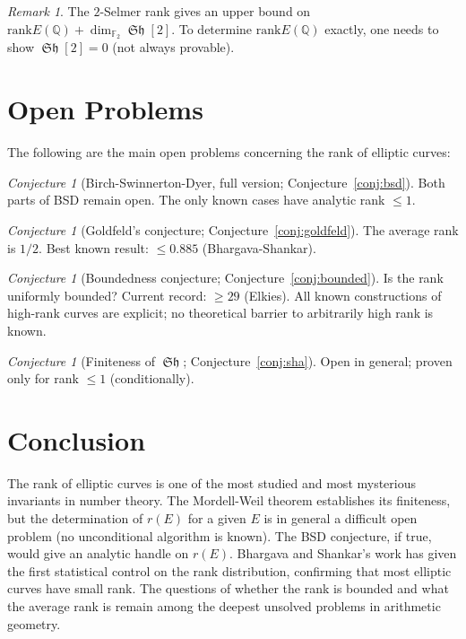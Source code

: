 \documentclass[12pt,a4paper]{amsart}
\theoremstyle{definition}
\theoremstyle{remark}
\newtheorem{remark}[theorem]{Remark}
\newtheorem{conjecture}[theorem]{Conjecture}
\newcommand{\Q}{\mathbb{Q}}
\newcommand{\F}{\mathbb{F}}
\DeclareMathOperator{\Sha}{\mathfrak{Sh}}
\newcommand{\rank}{\mathrm{rank}}
\begin{document}
\begin{remark}
  The $2$-Selmer rank gives an upper bound on $\rank E(\Q) + \dim_{\F_2} \Sha[2]$.
  To determine $\rank E(\Q)$ exactly, one needs to show $\Sha[2] = 0$ (not always provable).
\end{remark}

\section{Open Problems}\label{sec:openproblems}

The following are the main open problems concerning the rank of elliptic curves:

\begin{conjecture}[Birch-Swinnerton-Dyer, full version; Conjecture~\ref{conj:bsd}]
  Both parts of BSD remain open.
  The only known cases have analytic rank $\leq 1$.
\end{conjecture}

\begin{conjecture}[Goldfeld's conjecture; Conjecture~\ref{conj:goldfeld}]
  The average rank is $1/2$.
  Best known result: $\leq 0.885$ (Bhargava-Shankar).
\end{conjecture}

\begin{conjecture}[Boundedness conjecture; Conjecture~\ref{conj:bounded}]
  Is the rank uniformly bounded?
  Current record: $\geq 29$ (Elkies).
  All known constructions of high-rank curves are explicit; no theoretical barrier
  to arbitrarily high rank is known.
\end{conjecture}

\begin{conjecture}[Finiteness of $\Sha$; Conjecture~\ref{conj:sha}]
  Open in general; proven only for rank $\leq 1$ (conditionally).
\end{conjecture}

\section{Conclusion}\label{sec:conclusion}

The rank of elliptic curves is one of the most studied and most mysterious invariants
in number theory. The Mordell-Weil theorem establishes its finiteness, but the
determination of $r(E)$ for a given $E$ is in general a difficult open problem (no
unconditional algorithm is known). The BSD conjecture, if true, would give an
analytic handle on $r(E)$. Bhargava and Shankar's work has given the first statistical
control on the rank distribution, confirming that most elliptic curves have small rank.
The questions of whether the rank is bounded and what the average rank is remain
among the deepest unsolved problems in arithmetic geometry.
\end{document}
